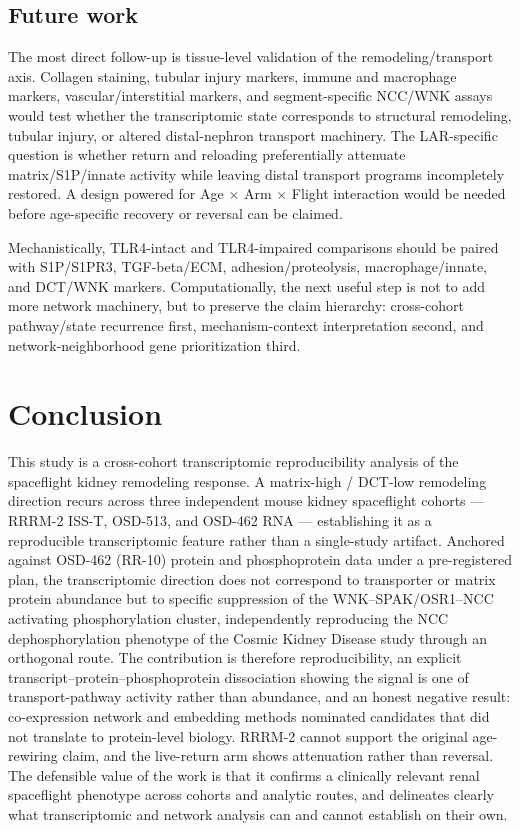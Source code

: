 \documentclass[11pt]{article}
\begin{document}
\subsection{Future work}

The most direct follow-up is tissue-level validation of the remodeling/transport axis. Collagen staining, tubular injury markers, immune and macrophage markers, vascular/interstitial markers, and segment-specific NCC/WNK assays would test whether the transcriptomic state corresponds to structural remodeling, tubular injury, or altered distal-nephron transport machinery. The LAR-specific question is whether return and reloading preferentially attenuate matrix/S1P/innate activity while leaving distal transport programs incompletely restored. A design powered for Age $\times$ Arm $\times$ Flight interaction would be needed before age-specific recovery or reversal can be claimed.

Mechanistically, TLR4-intact and TLR4-impaired comparisons should be paired with S1P/S1PR3, TGF-beta/ECM, adhesion/proteolysis, macrophage/innate, and DCT/WNK markers. Computationally, the next useful step is not to add more network machinery, but to preserve the claim hierarchy: cross-cohort pathway/state recurrence first, mechanism-context interpretation second, and network-neighborhood gene prioritization third.

\section{Conclusion}

This study is a cross-cohort transcriptomic reproducibility analysis of the spaceflight kidney remodeling response. A matrix-high / DCT-low remodeling direction recurs across three independent mouse kidney spaceflight cohorts --- RRRM-2 ISS-T, OSD-513, and OSD-462 RNA --- establishing it as a reproducible transcriptomic feature rather than a single-study artifact. Anchored against OSD-462 (RR-10) protein and phosphoprotein data under a pre-registered plan, the transcriptomic direction does not correspond to transporter or matrix protein abundance but to specific suppression of the WNK--SPAK/OSR1--NCC activating phosphorylation cluster, independently reproducing the NCC dephosphorylation phenotype of the Cosmic Kidney Disease study \citep{siew2024cosmic} through an orthogonal route. The contribution is therefore reproducibility, an explicit transcript--protein--phosphoprotein dissociation showing the signal is one of transport-pathway activity rather than abundance, and an honest negative result: co-expression network and embedding methods nominated candidates that did not translate to protein-level biology. RRRM-2 cannot support the original age-rewiring claim, and the live-return arm shows attenuation rather than reversal. The defensible value of the work is that it confirms a clinically relevant renal spaceflight phenotype across cohorts and analytic routes, and delineates clearly what transcriptomic and network analysis can and cannot establish on their own.
\end{document}
